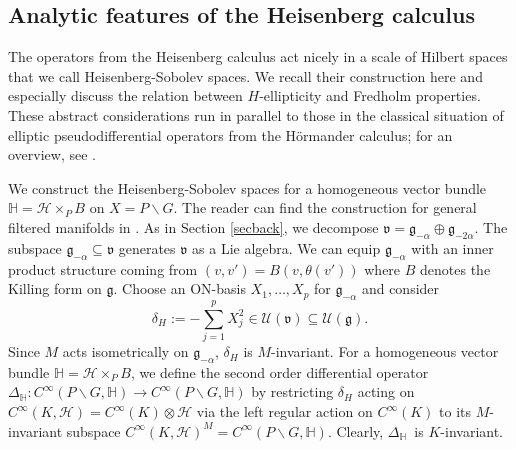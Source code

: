 \documentclass[a4paper,reqno]{amsart}
\numberwithin{equation}{section}
\theoremstyle{definition}
\theoremstyle{remark}
\begin{document}
\subsection{Analytic features of the Heisenberg calculus}

The operators from the Heisenberg calculus act nicely in a scale of Hilbert spaces that we call Heisenberg-Sobolev spaces. We recall their construction here and especially discuss the relation between $H$-ellipticity and Fredholm properties. These abstract considerations run in parallel to those in the classical situation of elliptic pseudodifferential operators from the Hörmander calculus; for an overview, see \cite[Chapter 1]{shubinbook}.

We construct the Heisenberg-Sobolev spaces for a homogeneous vector bundle $\mathbb{H}=\mathcal{H}\times_P B$ on $X=P\backslash G$. The reader can find the construction for general filtered manifolds in \cite{Dave_Haller1,goffkuz}. As in Section \ref{secback}, we decompose $\mathfrak{v}=\mathfrak{g}_{-\alpha}\oplus \mathfrak{g}_{-2\alpha}$. The subspace $\mathfrak{g}_{-\alpha}\subseteq \mathfrak{v}$ generates $\mathfrak{v}$ as a Lie algebra. We can equip $\mathfrak{g}_{-\alpha}$ with an inner product structure coming from $(v,v')=B(v,\theta(v'))$ where $B$ denotes the Killing form on $\mathfrak{g}$. Choose an ON-basis $X_1,\ldots, X_p$ for $\mathfrak{g}_{-\alpha}$ and consider 
$$\delta_H:=-\sum_{j=1}^p X_j^2\in \mathcal{U}(\mathfrak{v})\subseteq \mathcal{U}(\mathfrak{g}).$$
Since $M$ acts isometrically on $\mathfrak{g}_{-\alpha}$, $\delta_H$ is $M$-invariant. For a homogeneous vector bundle $\mathbb{H}=\mathcal{H}\times_P B$, we define the second order differential operator $\Delta_{\mathbb{H}}:C^\infty(P\backslash G,\mathbb{H})\to C^\infty(P\backslash G,\mathbb{H})$ by restricting $\delta_H$ acting on $C^\infty(K,\mathcal{H})=C^\infty(K)\otimes \mathcal{H}$ via the left regular action on $C^\infty(K)$ to its $M$-invariant subspace $C^\infty(K,\mathcal{H})^M=C^\infty(P\backslash G,\mathbb{H})$. Clearly, $\Delta_{\mathbb{H}}$ is $K$-invariant.
\end{document}

